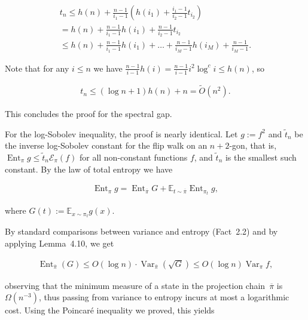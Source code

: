 \[\begin{gathered}
\displaystyle t_{n} \displaystyle\leq h(n)+\frac{n-1}{i_{1}-1}\left(h(i_{1})+\frac{i_{1}-1}{i_{2}-1}t_{i_{2}}\right) \\
\displaystyle=h(n)+\frac{n-1}{i_{1}-1}h(i_{1})+\frac{n-1}{i_{2}-1}t_{i_{2}} \\
\displaystyle\leq h(n)+\frac{n-1}{i_{1}-1}h(i_{1})+\dots+\frac{n-1}{i_{M}-1}h(i_{M})+\frac{n-1}{i_{M}-1}.
\end{gathered}\]


Note that for any $i\leq n$ we have $\frac{n-1}{i-1}h(i)=\frac{n-1}{i-1}i^{2}\log^{c}i\leq h(n)$, so\par


\[\begin{gathered}
t_{n}\leq(\log n+1)h(n)+n=\widetilde{O}(n^{2}).
\end{gathered}\]


This concludes the proof for the spectral gap.\par




For the log-Sobolev inequality, the proof is nearly identical. Let $g:=f^{2}$ and $\tilde{t}_{n}$ be the inverse log-Sobolev constant for the flip walk on an $n+2$-gon, that is, $\operatorname{Ent}_{\pi}g\leq\tilde{t}_{n}\mathcal{E}_{\pi}(f)$ for all non-constant functions $f$, and $\tilde{t}_{n}$ is the smallest such constant. By the law of total entropy we have\par


\[\begin{gathered}
\operatorname{Ent}_{\pi}g=\operatorname{Ent}_{\overline{\pi}}G+\mathbb{E}_{t\sim\overline{\pi}}\operatorname{Ent}_{\pi_{t}}g,
\end{gathered}\]


where $G(t):=\mathbb{E}_{x\sim\pi_{t}}g(x)$.\par




By standard comparisons between variance and entropy (Fact 2.2) and by applying Lemma 4.10, we get\par


\[\begin{gathered}
\operatorname{Ent}_{\bar{\pi}}(G)\leq O(\log n)\cdot\operatorname{Var}_{\bar{\pi}}(\sqrt{G})\leq O(\log n)\operatorname{Var}_{\pi}f,
\end{gathered}\]


observing that the minimum measure of a state in the projection chain $\overline{\pi}$ is $\Omega(n^{-3})$, thus passing from variance to entropy incurs at most a logarithmic cost. Using the Poincaré inequality we proved, this yields\par


